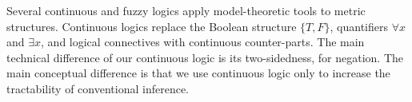 Several continuous \cite{levin2000continuous} and fuzzy \cite{klir1995fuzzy} logics apply model-theoretic tools to metric structures.
Continuous logics replace the Boolean structure $\{T, F\}$, quantifiers $\forall x$ and $\exists x$, and logical connectives with continuous counter-parts.
The main technical difference of our continuous logic is its two-sidedness, for negation. 
The main conceptual difference is that we use continuous logic only to increase the tractability of conventional inference.



